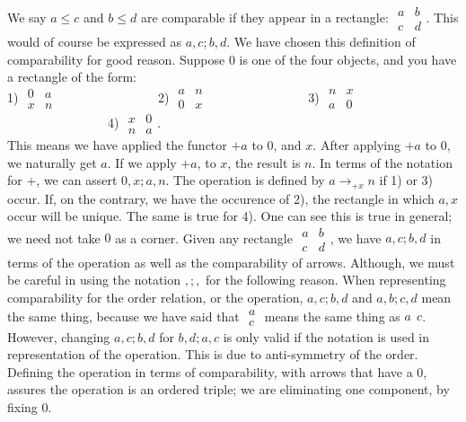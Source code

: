 \documentclass [12pt]{book}
\begin{document}
We say $a\leq c$ and $b\leq d$ are comparable if they appear in a rectangle: $\begin{array}{rr}a & b \\ c & d \end{array}$. This would of course be expressed as $a,c;b,d$. We have chosen this definition of comparability for good reason. Suppose $0$ is one of the four objects, and you have a rectangle of the form:\\1) 
$\begin{array}{rr} 0 & a \\ x & n\end{array}$~~~~~~~~~~~~~~~~2) $\begin{array}{rr} a & n \\ 0 & x\end{array}$~~~~~~~~~~~~~~~~3)  $\begin{array}{rr} n & x\\ a & 0\end{array}$~~~~~~~~~~~~~~~~4) $\begin{array}{rr} x & 0 \\ n & a\end{array}$.\\This means we have applied the functor $+a$ to 0, and $x$. After applying $+a$ to 0, we naturally get $a$. If we apply $+a$, to $x$, the result is $n$. In terms of the notation for $+$, we can assert $0,x;a,n$. The operation is defined by $a\rightarrow_{+x}n$ if 1) or 3) occur. If, on the contrary, we have the occurence of 2), the rectangle in which $a,x$ occur will be unique. The same is true for 4). One can see this is true in general; we need not take $0$ as a corner. Given any rectangle $\begin{array}{rr} a & b \\ c & d\end{array}$, we have $a,c;b,d$ in terms of the operation as well as the comparability of arrows. Although, we must be careful in using the notation $,;,$ for the following reason. When representing comparability for the order relation, or the operation, $a,c;b,d$ and $a,b;c,d$ mean the same thing, because we have said that $\begin{array}{rr}a\\c\end{array}$ means the same thing as $a~~c$. However, changing $a,c;b,d$ for $b,d;a,c$ is only valid if the notation is used in representation of the operation. This is due to anti-symmetry of the order. Defining the operation in terms of comparability, with arrows that have a 0, assures the operation is an ordered triple; we are eliminating one component, by fixing 0.
\end{document}
